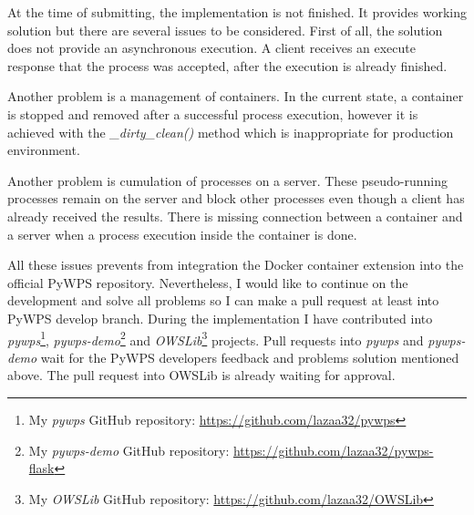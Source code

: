 \newpage
At the time of submitting, the implementation is not finished. It
provides working solution but there are several issues to be
considered. First of all, the solution does not provide an
asynchronous execution. A client receives an execute response that the
process was accepted, after the execution is already finished.

Another problem is a management of containers. In the current state, a
container is stopped and removed after a successful process execution,
however it is achieved with the \textit{\_dirty\_clean()} method which
is inappropriate for production environment.

Another problem is cumulation of processes on a server. These
pseudo-running processes remain on the server and block other
processes even though a client has already received the results. There
is missing connection between a container and a server when a process
execution inside the container is done.

All these issues prevents from integration the Docker container
extension into the official PyWPS repository.  Nevertheless, I would
like to continue on the development and solve all problems so I can
make a pull request at least into PyWPS develop branch. During the
implementation I have contributed into \textit{pywps}\footnote{My
  \textit{pywps} GitHub repository:
  \url{https://github.com/lazaa32/pywps}},
\textit{pywps-demo}\footnote{My \textit{pywps-demo} GitHub repository:
  \url{https://github.com/lazaa32/pywps-flask}} and
\textit{OWSLib}\footnote{My \textit{OWSLib} GitHub repository:
  \url{https://github.com/lazaa32/OWSLib}} projects. Pull requests
into \textit{pywps} and \textit{pywps-demo} wait for the PyWPS
developers feedback and problems solution mentioned above. The pull
request into OWSLib is already waiting for approval.
